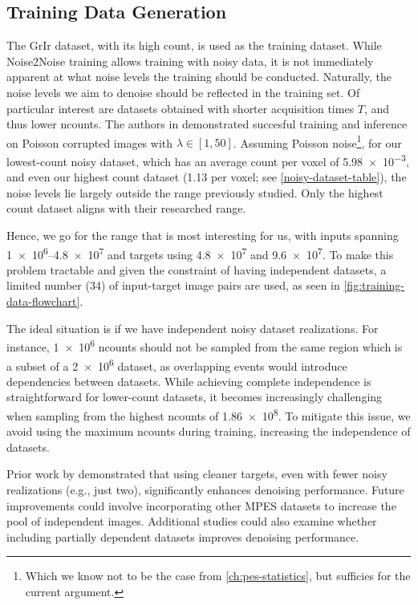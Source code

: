 \subsection{Training Data Generation}
The \gls{GrIr} dataset, with its high count, is used as the training dataset. While Noise2Noise training allows training with noisy data, it is not immediately apparent at what noise levels the training should be conducted. Naturally, the noise levels we aim to denoise should be reflected in the training set. Of particular interest are datasets obtained with shorter acquisition times $T$, and thus lower \gls{ncounts}. The authors in \cite{lehtinenNoise2NoiseLearningImage2018} demonstrated succesful training and inference on Poisson corrupted images with $\lambda \in [1, 50]$. Assuming Poisson noise\footnote{Which we know not to be the case from \cref{ch:pes-statistics}, but 
sufficies for the current argument.}, for our lowest-count noisy dataset, which has an average count per voxel of \num{5.98e-3}, and even our highest count dataset (\num{1.13} per voxel; see \cref{noisy-dataset-table}), the noise levels lie largely outside the range previously studied. Only the highest count dataset aligns with their researched range.

Hence, we go for the range that is most interesting for us, with inputs spanning \numrange{1e6}{4.8e7} and targets using \num{4.8e7} and \num{9.6e7}. To make this problem tractable and given the constraint of having independent datasets, a limited number (\num{34}) of input-target image pairs are used, as seen in \cref{fig:training-data-flowchart}. 

The ideal situation is if we have independent noisy dataset realizations. For instance, \num{1e6} \gls{ncounts} should not be sampled from the same region which is a subset of a \num{2e6} dataset, as overlapping events would introduce dependencies between datasets. While achieving complete independence is straightforward for lower-count datasets, it becomes increasingly challenging when sampling from the highest \gls{ncounts} of \num{1.86e8}. To mitigate this issue, we avoid using the maximum \gls{ncounts} during training, increasing the independence of datasets. 

Prior work by \citeauthor{lehtinenNoise2NoiseLearningImage2018} demonstrated that using cleaner targets, even with fewer noisy realizations (e.g., just two), significantly enhances denoising performance. Future improvements could involve incorporating other \gls{MPES} datasets to increase the pool of independent images. Additional studies could also examine whether including partially dependent datasets improves denoising performance.

